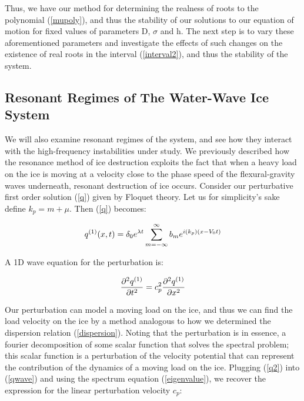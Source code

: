 \documentclass{article}
\begin{document}
\vspace{10}
Thus, we have our method for determining the realness of roots to the polynomial (\ref{mupoly}), and thus the stability of our solutions to our equation of motion for fixed values of parameters D, \(\sigma\) and h. The next step is to vary these aforementioned parameters and investigate the effects of such changes on the existence of real roots in the interval (\ref{interval2}), and thus the stability of the system. \\

\subsection{Resonant Regimes of The Water-Wave Ice System}

We will also examine resonant regimes of the system, and see how they interact with the high-frequency instabilities under study. We previously described how the resonance method of ice destruction exploits the fact that when a heavy load on the ice is moving at a velocity close to the phase speed of the flexural-gravity waves underneath, resonant destruction of ice occurs. Consider our perturbative first order solution (\ref{q}) given by Floquet theory. Let us for simplicity's sake define \(k_{p} = m + \mu\). Then (\ref{q}) becomes:

\begin{equation} \label{q2}
  q^{(1)}(x,t) = \delta_{0}e^{\lambda t}\sum_{m=-\infty}^{\infty}b_{m}e^{i(k_{p})(x-V_{0}t)}
\\
\end{equation} 

A 1D wave equation for the perturbation is:

\begin{equation} \label{qwave}
  \frac{\partial^2{q^{(1)}}}{\partial{t}^2} = c_{p}^2 \frac{\partial^2{q^{(1)}}}{\partial{x}^2}
\\
\end{equation} 

Our perturbation can model a moving load on the ice, and thus we can find the load velocity on the ice by a method analogous to how we determined the dispersion relation (\ref{dispersion}). Noting that the perturbation is in essence, a fourier decomposition of some scalar function that solves the spectral problem; this scalar function is a perturbation of the velocity potential that can represent the contribution of the dynamics of a moving load on the ice. Plugging (\ref{q2}) into (\ref{qwave}) and using the spectrum equation (\ref{eigenvalue}), we recover the expression for the linear perturbation velocity \(c_{p}\): 
\end{document}
